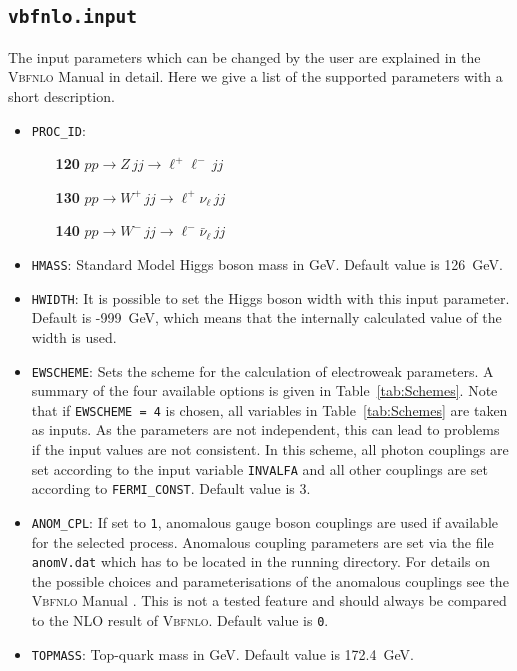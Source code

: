 \documentclass[a4paper,11pt]{article}
\begin{document}
\subsection*{{\tt vbfnlo.input}}
The input parameters which can be changed by the user are explained in the 
\textsc{Vbfnlo} Manual \cite{vbfnlo} in detail. Here we give a list of the supported parameters 
with a short description.

\begin{itemize}
\item {\tt PROC\_ID}: \begin{itemize}
        \item[\bf 120]  $p p \to Z \, jj \to \ell^{+} \ell^{-} \, jj$  
        \item[\bf 130]  $p p \to W^{+} \,  jj\to \ell^{+} \nu_\ell \, jj$  
        \item[\bf 140]  $p p \to W^{-} \, jj\to \ell^{-} \bar{\nu}_\ell  \, jj$  \end{itemize} 
\item {\tt HMASS}: Standard Model Higgs boson mass in GeV. Default value is 126~GeV.
\item {\tt HWIDTH}: It is possible to set the Higgs boson width with this input
parameter.  Default is -999~GeV, which means that the internally calculated
value of the width is used. 
\item {\tt EWSCHEME}: Sets the scheme for the calculation of electroweak
parameters. A summary of the four available options is given in
Table~\ref{tab:Schemes}. Note that if {\tt EWSCHEME = 4} is
chosen, all variables in Table~\ref{tab:Schemes} are taken as inputs.  As the
parameters are not independent, this can lead to problems if the input values
are not consistent.  In this scheme, all photon couplings are set according to
the input variable {\tt INVALFA} and all other couplings are set according to
{\tt FERMI\_CONST}. Default value is 3.
\item {\tt ANOM\_CPL}: If set to {\tt 1}, anomalous gauge
boson couplings are used if available for the selected process. Anomalous
coupling parameters are set via the file {\tt anomV.dat} which has to be located 
in the running directory.
For details on the possible choices and parameterisations of 
the anomalous couplings see the \textsc{Vbfnlo} Manual \cite{vbfnlo}. This is 
not a tested feature and should always be compared to the NLO result of 
\textsc{Vbfnlo}. Default value is {\tt 0}. 
\item {\tt TOPMASS}: Top-quark mass in GeV. Default value is 172.4~GeV. 

\end{itemize}
\end{document}
